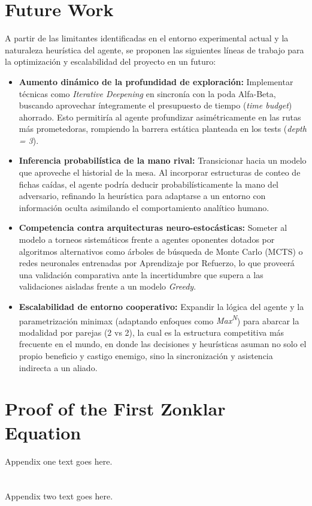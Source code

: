 \documentclass[journal,onecolumn]{IEEEtran}
\begin{document}
\section{Future Work}
A partir de las limitantes identificadas en el entorno experimental actual y la naturaleza heurística del agente, se proponen las siguientes líneas de trabajo para la optimización y escalabilidad del proyecto en un futuro:
\begin{itemize}
    \item \textbf{Aumento dinámico de la profundidad de exploración:} Implementar técnicas como \textit{Iterative Deepening} en sincronía con la 
    poda Alfa-Beta, buscando aprovechar íntegramente el presupuesto de tiempo (\textit{time budget}) ahorrado. Esto permitiría al agente profundizar
    asimétricamente en las rutas más prometedoras, rompiendo la barrera estática planteada en los tests (\textit{depth = 3}).
    \item \textbf{Inferencia probabilística de la mano rival:} Transicionar hacia un modelo que aproveche el historial de la mesa. 
    Al incorporar estructuras de conteo de fichas caídas, el agente podría deducir probabilísticamente la mano del adversario, refinando la 
    heurística para adaptarse a un entorno con información oculta asimilando el comportamiento analítico humano.
    \item \textbf{Competencia contra arquitecturas neuro-estocásticas:} Someter al modelo a torneos sistemáticos frente a agentes oponentes 
    dotados por algoritmos alternativos como árboles de búsqueda de Monte Carlo (MCTS) o redes neuronales entrenadas por Aprendizaje por Refuerzo,
    lo que proveerá una validación comparativa ante la incertidumbre que supera a las validaciones aisladas frente a un modelo \textit{Greedy}.
    \item \textbf{Escalabilidad de entorno cooperativo:} Expandir la lógica del agente y la parametrización minimax 
    (adaptando enfoques como \textit{Max\textsuperscript{N}}) para abarcar la modalidad por parejas (2 vs 2), la cual es la estructura 
    competitiva más frecuente en el mundo, en donde las decisiones y heurísticas asuman no solo el propio beneficio y castigo enemigo,
    sino la sincronización y asistencia indirecta a un aliado.
\end{itemize}

\appendices
\section{Proof of the First Zonklar Equation}
Appendix one text goes here.

\section{}
Appendix two text goes here.






\end{document}
